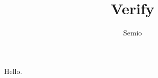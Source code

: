 \documentclass[type=report,theme=light,language=de]{semio}
\title{Verify}
\author{Semio}
\begin{document}
\begin{Window}[title=Only, row]
  Hello.
\end{Window}
\end{document}

